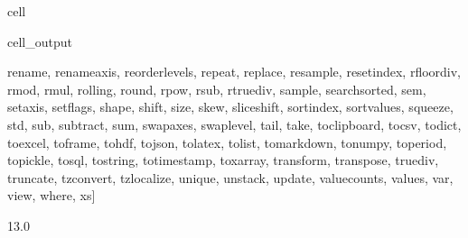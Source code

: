 \documentclass[letterpaper,10pt,english]{jupyterBook}
\begin{document}
\begin{sphinxuseclass}{cell}
\begin{sphinxVerbatimOutput}
\begin{sphinxuseclass}{cell_output}
\begin{sphinxVerbatim}[commandchars=\\\{\}]
\PYGZsq{}rename\PYGZsq{}, \PYGZsq{}rename\PYGZus{}axis\PYGZsq{}, \PYGZsq{}reorder\PYGZus{}levels\PYGZsq{}, \PYGZsq{}repeat\PYGZsq{}, \PYGZsq{}replace\PYGZsq{}, \PYGZsq{}resample\PYGZsq{}, \PYGZsq{}reset\PYGZus{}index\PYGZsq{}, \PYGZsq{}rfloordiv\PYGZsq{}, \PYGZsq{}rmod\PYGZsq{}, \PYGZsq{}rmul\PYGZsq{}, \PYGZsq{}rolling\PYGZsq{}, \PYGZsq{}round\PYGZsq{}, \PYGZsq{}rpow\PYGZsq{}, \PYGZsq{}rsub\PYGZsq{}, \PYGZsq{}rtruediv\PYGZsq{}, \PYGZsq{}sample\PYGZsq{}, \PYGZsq{}searchsorted\PYGZsq{}, \PYGZsq{}sem\PYGZsq{}, \PYGZsq{}set\PYGZus{}axis\PYGZsq{}, \PYGZsq{}set\PYGZus{}flags\PYGZsq{}, \PYGZsq{}shape\PYGZsq{}, \PYGZsq{}shift\PYGZsq{}, \PYGZsq{}size\PYGZsq{}, \PYGZsq{}skew\PYGZsq{}, \PYGZsq{}slice\PYGZus{}shift\PYGZsq{}, \PYGZsq{}sort\PYGZus{}index\PYGZsq{}, \PYGZsq{}sort\PYGZus{}values\PYGZsq{}, \PYGZsq{}squeeze\PYGZsq{}, \PYGZsq{}std\PYGZsq{}, \PYGZsq{}sub\PYGZsq{}, \PYGZsq{}subtract\PYGZsq{}, \PYGZsq{}sum\PYGZsq{}, \PYGZsq{}swapaxes\PYGZsq{}, \PYGZsq{}swaplevel\PYGZsq{}, \PYGZsq{}tail\PYGZsq{}, \PYGZsq{}take\PYGZsq{}, \PYGZsq{}to\PYGZus{}clipboard\PYGZsq{}, \PYGZsq{}to\PYGZus{}csv\PYGZsq{}, \PYGZsq{}to\PYGZus{}dict\PYGZsq{}, \PYGZsq{}to\PYGZus{}excel\PYGZsq{}, \PYGZsq{}to\PYGZus{}frame\PYGZsq{}, \PYGZsq{}to\PYGZus{}hdf\PYGZsq{}, \PYGZsq{}to\PYGZus{}json\PYGZsq{}, \PYGZsq{}to\PYGZus{}latex\PYGZsq{}, \PYGZsq{}to\PYGZus{}list\PYGZsq{}, \PYGZsq{}to\PYGZus{}markdown\PYGZsq{}, \PYGZsq{}to\PYGZus{}numpy\PYGZsq{}, \PYGZsq{}to\PYGZus{}period\PYGZsq{}, \PYGZsq{}to\PYGZus{}pickle\PYGZsq{}, \PYGZsq{}to\PYGZus{}sql\PYGZsq{}, \PYGZsq{}to\PYGZus{}string\PYGZsq{}, \PYGZsq{}to\PYGZus{}timestamp\PYGZsq{}, \PYGZsq{}to\PYGZus{}xarray\PYGZsq{}, \PYGZsq{}transform\PYGZsq{}, \PYGZsq{}transpose\PYGZsq{}, \PYGZsq{}truediv\PYGZsq{}, \PYGZsq{}truncate\PYGZsq{}, \PYGZsq{}tz\PYGZus{}convert\PYGZsq{}, \PYGZsq{}tz\PYGZus{}localize\PYGZsq{}, \PYGZsq{}unique\PYGZsq{}, \PYGZsq{}unstack\PYGZsq{}, \PYGZsq{}update\PYGZsq{}, \PYGZsq{}value\PYGZus{}counts\PYGZsq{}, \PYGZsq{}values\PYGZsq{}, \PYGZsq{}var\PYGZsq{}, \PYGZsq{}view\PYGZsq{}, \PYGZsq{}where\PYGZsq{}, \PYGZsq{}xs\PYGZsq{}]


13.0
\end{sphinxVerbatim}

\end{sphinxuseclass}\end{sphinxVerbatimOutput}

\end{sphinxuseclass}
\end{document}
